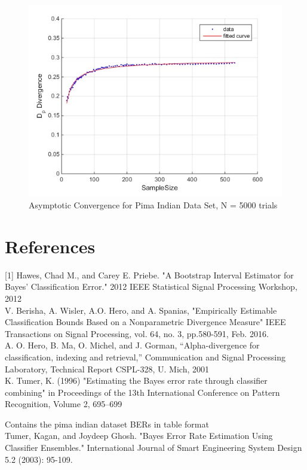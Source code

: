 \documentclass{article}
\begin{document}
		\begin{figure}[h]
			\caption{Asymptotic Convergence for Pima Indian Data Set, N = 5000 trials}
			\centering
				\includegraphics[scale=0.75]{dp_n5000}
		\end{figure}	
		
		\section*{References}
		[1] Hawes, Chad M., and Carey E. Priebe. "A Bootstrap Interval Estimator for Bayes' Classification Error." 2012 IEEE Statistical Signal Processing Workshop, 2012
		\\ [0.5ex]
		\noindent[2] V. Berisha, A. Wisler, A.O. Hero, and A. Spanias, "Empirically Estimable Classification Bounds Based on a Nonparametric Divergence Measure" IEEE Transactions on Signal Processing, vol. 64, no. 3, pp.580-591, Feb. 2016.
		\\ [0.5ex]
		\noindent[3] A. O. Hero, B. Ma, O. Michel, and J. Gorman, “Alpha-divergence for classification, indexing and retrieval,” Communication and Signal Processing Laboratory, Technical Report CSPL-328, U. Mich, 2001
		\\ [0.5ex]
		\noindent [4] K. Tumer, K. (1996) "Estimating the Bayes error rate through classifier combining" in Proceedings of the 13th International Conference on Pattern Recognition, Volume 2, 695–699
		
		Contains the pima indian dataset BERs in table format
		\\ [0.5ex]
		\noindent[5] Tumer, Kagan, and Joydeep Ghosh. "Bayes Error Rate Estimation Using Classifier Ensembles." International Journal of Smart Engineering System Design 5.2 (2003): 95-109.
		\\ [0.5ex]
		
		
		
\end{document}
